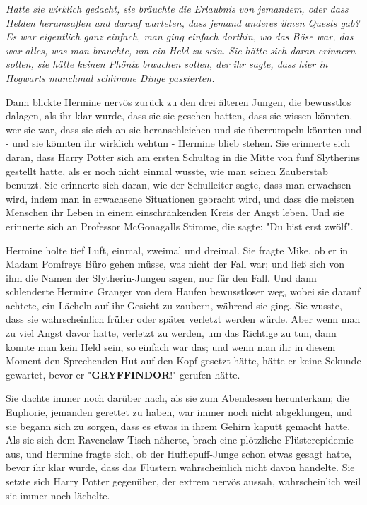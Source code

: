 {\emph{Hatte sie wirklich gedacht, sie bräuchte die Erlaubnis von jemandem, oder dass Helden herumsaßen und darauf warteten, dass jemand anderes ihnen Quests gab? Es war eigentlich ganz einfach, man ging einfach dorthin, wo das Böse war, das war alles, was man brauchte, um ein Held zu sein.} \emph{Sie hätte sich daran erinnern sollen, sie hätte keinen Phönix brauchen sollen, der ihr sagte, dass hier in Hogwarts manchmal schlimme Dinge passierten.}

Dann blickte Hermine nervös zurück zu den drei älteren Jungen, die bewusstlos dalagen, als ihr klar wurde, dass sie sie gesehen hatten, dass sie wissen könnten, wer sie war, dass sie sich an sie heranschleichen und sie überrumpeln könnten und - und sie könnten ihr wirklich wehtun - Hermine blieb stehen. Sie erinnerte sich daran, dass Harry Potter sich am ersten Schultag in die Mitte von fünf Slytherins gestellt hatte, als er noch nicht einmal wusste, wie man seinen Zauberstab benutzt. Sie erinnerte sich daran, wie der Schulleiter sagte, dass man erwachsen wird, indem man in erwachsene Situationen gebracht wird, und dass die meisten Menschen ihr Leben in einem einschränkenden Kreis der Angst leben. Und sie erinnerte sich an Professor McGonagalls Stimme, die sagte: "Du bist erst zwölf".

Hermine holte tief Luft, einmal, zweimal und dreimal. Sie fragte Mike, ob er in Madam Pomfreys Büro gehen müsse, was nicht der Fall war; und ließ sich von ihm die Namen der Slytherin-Jungen sagen, nur für den Fall. Und dann schlenderte Hermine Granger von dem Haufen bewusstloser weg, wobei sie darauf achtete, ein Lächeln auf ihr Gesicht zu zaubern, während sie ging. Sie wusste, dass sie wahrscheinlich früher oder später verletzt werden würde. Aber wenn man zu viel Angst davor hatte, verletzt zu werden, um das Richtige zu tun, dann konnte man kein Held sein, so einfach war das; und wenn man ihr in diesem Moment den Sprechenden Hut auf den Kopf gesetzt hätte, hätte er keine Sekunde gewartet, bevor er "\textbf{GRYFFINDOR}!" gerufen hätte.

Sie dachte immer noch darüber nach, als sie zum Abendessen herunterkam; die Euphorie, jemanden gerettet zu haben, war immer noch nicht abgeklungen, und sie begann sich zu sorgen, dass es etwas in ihrem Gehirn kaputt gemacht hatte. Als sie sich dem Ravenclaw-Tisch näherte, brach eine plötzliche Flüsterepidemie aus, und Hermine fragte sich, ob der Hufflepuff-Junge schon etwas gesagt hatte, bevor ihr klar wurde, dass das Flüstern wahrscheinlich nicht davon handelte. Sie setzte sich Harry Potter gegenüber, der extrem nervös aussah, wahrscheinlich weil sie immer noch lächelte.

}
